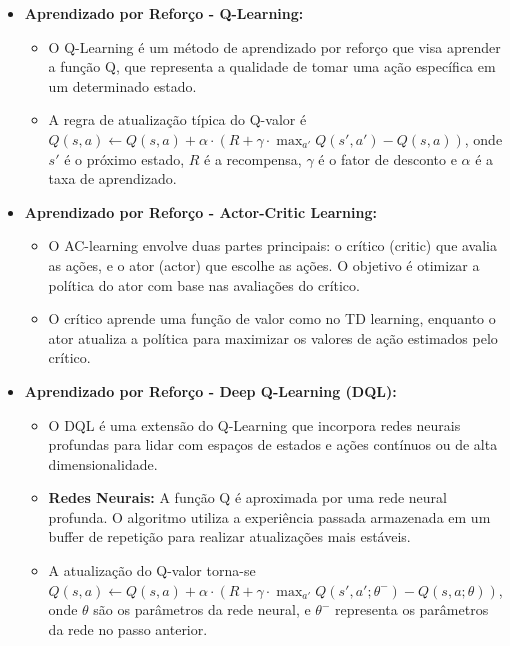 \begin{itemize}
	\item \textbf{Aprendizado por Reforço - Q-Learning:}
	
	\begin{itemize}
		\item O Q-Learning é um método de aprendizado por reforço que visa aprender a função Q, que representa a qualidade de tomar uma ação específica em um determinado estado.
		\item A regra de atualização típica do Q-valor é \(Q(s, a) \leftarrow Q(s, a) + \alpha \cdot (R + \gamma \cdot \max_{a'} Q(s', a') - Q(s, a))\), onde \(s'\) é o próximo estado, \(R\) é a recompensa, \(\gamma\) é o fator de desconto e \(\alpha\) é a taxa de aprendizado.
	\end{itemize}
	
	\item \textbf{Aprendizado por Reforço - Actor-Critic Learning:}
	
	\begin{itemize}
		\item O AC-learning envolve duas partes principais: o crítico (critic) que avalia as ações, e o ator (actor) que escolhe as ações. O objetivo é otimizar a política do ator com base nas avaliações do crítico.
		\item O crítico aprende uma função de valor como no TD learning, enquanto o ator atualiza a política para maximizar os valores de ação estimados pelo crítico.
	\end{itemize}
	
	\item \textbf{Aprendizado por Reforço - Deep Q-Learning (DQL):}
	
	\begin{itemize}
		\item O DQL é uma extensão do Q-Learning que incorpora redes neurais profundas para lidar com espaços de estados e ações contínuos ou de alta dimensionalidade.
		\item \textbf{Redes Neurais:} A função Q é aproximada por uma rede neural profunda. O algoritmo utiliza a experiência passada armazenada em um buffer de repetição para realizar atualizações mais estáveis.
		\item A atualização do Q-valor torna-se \(Q(s, a) \leftarrow Q(s, a) + \alpha \cdot (R + \gamma \cdot \max_{a'} Q(s', a'; \theta^-) - Q(s, a; \theta))\), onde \(\theta\) são os parâmetros da rede neural, e \(\theta^-\) representa os parâmetros da rede no passo anterior.
	\end{itemize}
\end{itemize}

